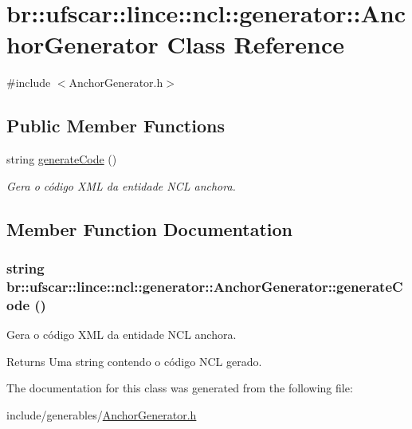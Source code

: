 \hypertarget{classbr_1_1ufscar_1_1lince_1_1ncl_1_1generator_1_1AnchorGenerator}{
\section{br::ufscar::lince::ncl::generator::AnchorGenerator Class Reference}
\label{classbr_1_1ufscar_1_1lince_1_1ncl_1_1generator_1_1AnchorGenerator}
}


{\ttfamily \#include $<$AnchorGenerator.h$>$}

\subsection*{Public Member Functions}
\begin{DoxyCompactItemize}
\item 
string \hyperlink{classbr_1_1ufscar_1_1lince_1_1ncl_1_1generator_1_1AnchorGenerator_a6d11585141187bca21114e5d069ef16b}{generateCode} ()
\begin{DoxyCompactList}\small\item\em Gera o código XML da entidade NCL anchora. \item\end{DoxyCompactList}\end{DoxyCompactItemize}


\subsection{Member Function Documentation}
\hypertarget{classbr_1_1ufscar_1_1lince_1_1ncl_1_1generator_1_1AnchorGenerator_a6d11585141187bca21114e5d069ef16b}{
\subsubsection[{generateCode}]{\setlength{\rightskip}{0pt plus 5cm}string br::ufscar::lince::ncl::generator::AnchorGenerator::generateCode ()}}
\label{classbr_1_1ufscar_1_1lince_1_1ncl_1_1generator_1_1AnchorGenerator_a6d11585141187bca21114e5d069ef16b}


Gera o código XML da entidade NCL anchora. 

\begin{DoxyReturn}{Returns}
Uma string contendo o código NCL gerado. 
\end{DoxyReturn}


The documentation for this class was generated from the following file:\begin{DoxyCompactItemize}
\item 
include/generables/\hyperlink{AnchorGenerator_8h}{AnchorGenerator.h}\end{DoxyCompactItemize}
